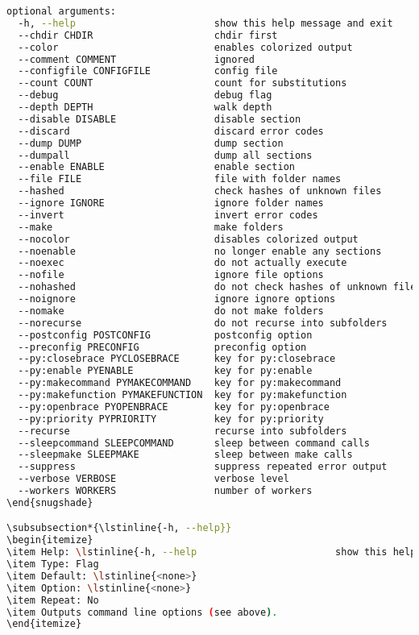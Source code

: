 \begin{snugshade}
\begin{lstlisting}[language=bash]
optional arguments:
  -h, --help                        show this help message and exit
  --chdir CHDIR                     chdir first
  --color                           enables colorized output
  --comment COMMENT                 ignored
  --configfile CONFIGFILE           config file
  --count COUNT                     count for substitutions
  --debug                           debug flag
  --depth DEPTH                     walk depth
  --disable DISABLE                 disable section
  --discard                         discard error codes
  --dump DUMP                       dump section
  --dumpall                         dump all sections
  --enable ENABLE                   enable section
  --file FILE                       file with folder names
  --hashed                          check hashes of unknown files
  --ignore IGNORE                   ignore folder names
  --invert                          invert error codes
  --make                            make folders
  --nocolor                         disables colorized output
  --noenable                        no longer enable any sections
  --noexec                          do not actually execute
  --nofile                          ignore file options
  --nohashed                        do not check hashes of unknown files
  --noignore                        ignore ignore options
  --nomake                          do not make folders
  --norecurse                       do not recurse into subfolders
  --postconfig POSTCONFIG           postconfig option
  --preconfig PRECONFIG             preconfig option
  --py:closebrace PYCLOSEBRACE      key for py:closebrace
  --py:enable PYENABLE              key for py:enable
  --py:makecommand PYMAKECOMMAND    key for py:makecommand
  --py:makefunction PYMAKEFUNCTION  key for py:makefunction
  --py:openbrace PYOPENBRACE        key for py:openbrace
  --py:priority PYPRIORITY          key for py:priority
  --recurse                         recurse into subfolders
  --sleepcommand SLEEPCOMMAND       sleep between command calls
  --sleepmake SLEEPMAKE             sleep between make calls
  --suppress                        suppress repeated error output
  --verbose VERBOSE                 verbose level
  --workers WORKERS                 number of workers
\end{snugshade}

\subsubsection*{\lstinline{-h, --help}}
\begin{itemize}
\item Help: \lstinline{-h, --help                        show this help message and exit}
\item Type: Flag
\item Default: \lstinline{<none>}
\item Option: \lstinline{<none>}
\item Repeat: No
\item Outputs command line options (see above).
\end{itemize}


\end{lstlisting}
\end{snugshade}
